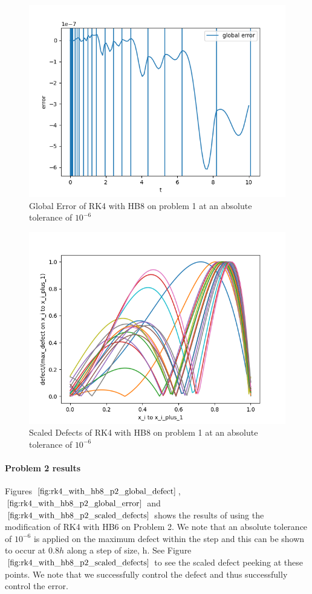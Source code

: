 \documentclass{article}
\begin{document}
\begin{figure}[H]
\centering
\includegraphics[width=0.7\linewidth]{./figures/rk4_with_hb8_p1_global_error}
\caption{Global Error of RK4 with HB8 on problem 1 at an absolute tolerance of $10^{-6}$}
\label{fig:rk4_with_hb8_p1_global_error}
\end{figure}

\begin{figure}[H]
\centering
\includegraphics[width=0.7\linewidth]{./figures/rk4_with_hb8_p1_scaled_defects}
\caption{Scaled Defects of RK4 with HB8 on problem 1 at an absolute tolerance of $10^{-6}$}
\label{fig:rk4_with_hb8_p1_scaled_defects}
\end{figure}

\paragraph{Problem 2 results}
Figures $\ref{fig:rk4_with_hb8_p2_global_defect}$, $\ref{fig:rk4_with_hb8_p2_global_error}$ and $\ref{fig:rk4_with_hb8_p2_scaled_defects}$ shows the results of using the modification of RK4 with HB6 on Problem 2. We note that an absolute tolerance of $10^{-6}$ is applied on the maximum defect within the step and this can be shown to occur at $0.8h$ along a step of size, h. See Figure $\ref{fig:rk4_with_hb8_p2_scaled_defects}$ to see the scaled defect peeking at these points. We note that we successfully control the defect and thus successfully control the error.
\end{document}
